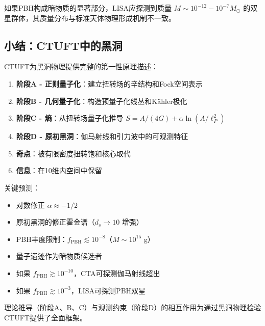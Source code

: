 \begin{prediction}[PBH质量谱异常]
如果PBH构成暗物质的显著部分，LISA应探测到质量 $M \sim 10^{-12} - 10^{-7} M_\odot$ 的双星群体，其质量分布与标准天体物理形成机制不一致。
\end{prediction}

\subsection{小结：CTUFT中的黑洞}

CTUFT为黑洞物理提供完整的第一性原理描述：

\begin{enumerate}
    \item \textbf{阶段A - 正则量子化}：建立扭转场的辛结构和Fock空间表示
    \item \textbf{阶段B - 几何量子化}：构造预量子化线丛和Kähler极化
    \item \textbf{阶段C - 熵}：从扭转场量子化推导 $S = A/(4G) + \alpha\ln(A/\ell_P^2)$
    \item \textbf{阶段D - 原初黑洞}：伽马射线和引力波中的可观测特征
    \item \textbf{奇点}：被有限密度扭转饱和核心取代
    \item \textbf{信息}：在10维内空间中保留
\end{enumerate}

关键预测：
\begin{itemize}
    \item 对数修正 $\alpha \approx -1/2$
    \item 原初黑洞的修正霍金谱（$d_s \to 10$ 增强）
    \item PBH丰度限制：$f_{\text{PBH}} \lesssim 10^{-8}$（$M \sim 10^{15}$ g）
    \item 量子遗迹作为暗物质候选者
    \item 如果 $f_{\text{PBH}} \gtrsim 10^{-10}$，CTA可探测伽马射线超出
    \item 如果 $f_{\text{PBH}} \gtrsim 10^{-3}$，LISA可探测PBH双星
\end{itemize}

理论推导（阶段A、B、C）与观测约束（阶段D）的相互作用为通过黑洞物理检验CTUFT提供了全面框架。
